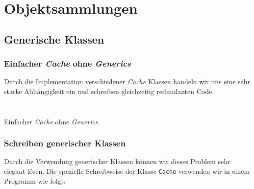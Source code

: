 
\section{Objektsammlungen}
\label{sec:collections}

\subsection{Generische Klassen}
\label{subsec:generics}

\begin{frame}[fragile]
    \frametitle<presentation>{Einfacher \emph{Cache} ohne \emph{Generics}}
\end{frame}


\mode*
Durch die Implementation verschiedener \emph{Cache} Klassen handeln wir
uns eine sehr starke Abhängigkeit ein und schreiben gleichzeitig redundanten
Code.


\begin{listing}[ht]
    \centering
    \begin{minipage}{0.45\textwidth}
        \inputminted[frame=single,linenos]{java}{../java/generics/CacheString.java}
    \end{minipage}
    \begin{minipage}{0.45\textwidth}
        \inputminted[frame=single]{java}{../java/generics/CacheShirt.java}
    \end{minipage}
    \caption{Einfacher \emph{Cache} ohne \emph{Generics}}
    \label{lst:non-generic-classes}
\end{listing}


\begin{frame}[fragile]
	\frametitle<presentation>{Schreiben generischer Klassen}
\end{frame}


Durch die Verwendung generischer Klassen können wir dieses Problem sehr elegant
lösen. Die spezielle Schreibweise der Klasse \texttt{Cache} verwenden wir in
einem Programm wie folgt:

